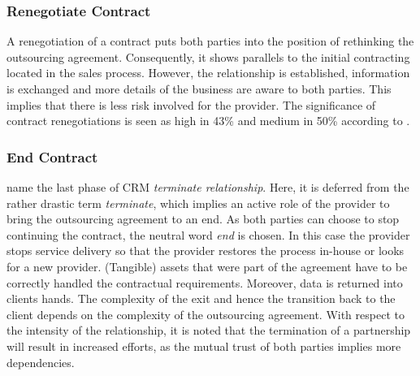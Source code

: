 	\subsubsection{Renegotiate Contract}
	A renegotiation of a contract puts both parties into the position of rethinking the outsourcing agreement. Consequently, it shows parallels to the initial contracting located in the sales process. However, the relationship is established, information is exchanged and more details of the business are aware to both parties. This implies that there is less risk involved for the provider. The significance of contract renegotiations is seen as high in 43\% and medium in 50\% according to \cite{itgov2005}. 
	
	
	\subsubsection{End Contract}
	\cite{reinartz2004customer} name the last phase of \acrshort{CRM} \textit{terminate relationship}. Here, it is deferred from the rather drastic term \textit{terminate}, which implies an active role of the provider to bring the outsourcing agreement to an end. As both parties can choose to stop continuing the contract, the neutral word \textit{end} is chosen. In this case the provider stops service delivery so that the provider restores the process in-house or looks for a new provider. (Tangible) assets that were part of the agreement have to be correctly handled \wrt the contractual requirements. Moreover, data is returned into clients hands. The complexity of the exit and hence the transition back to the client depends on the complexity of the outsourcing agreement. With respect to the intensity of the relationship, it is noted that the termination of a partnership will result in increased efforts, as the mutual trust of both parties implies more dependencies. 
	
